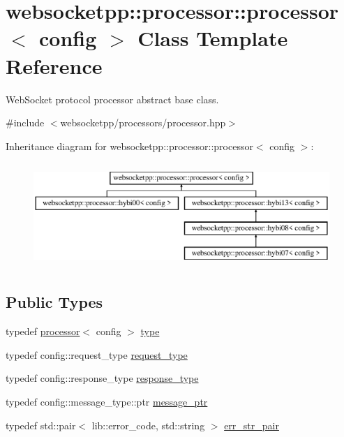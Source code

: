 \hypertarget{classwebsocketpp_1_1processor_1_1processor}{}\section{websocketpp\+:\+:processor\+:\+:processor$<$ config $>$ Class Template Reference}
\label{classwebsocketpp_1_1processor_1_1processor}


Web\+Socket protocol processor abstract base class.  




{\ttfamily \#include $<$websocketpp/processors/processor.\+hpp$>$}

Inheritance diagram for websocketpp\+:\+:processor\+:\+:processor$<$ config $>$\+:\begin{figure}[H]
\begin{center}
\leavevmode
\includegraphics[height=4.000000cm]{classwebsocketpp_1_1processor_1_1processor}
\end{center}
\end{figure}
\subsection*{Public Types}
\begin{DoxyCompactItemize}
\item 
typedef \hyperlink{classwebsocketpp_1_1processor_1_1processor}{processor}$<$ config $>$ \hyperlink{classwebsocketpp_1_1processor_1_1processor_ae897e7144ad7b9ece176d13ea5078ae2}{type}
\item 
typedef config\+::request\+\_\+type \hyperlink{classwebsocketpp_1_1processor_1_1processor_ac3926102ce2422e6b40ccea41e764233}{request\+\_\+type}
\item 
typedef config\+::response\+\_\+type \hyperlink{classwebsocketpp_1_1processor_1_1processor_aa8d088af1bdb838f1e86df6cf4395981}{response\+\_\+type}
\item 
typedef config\+::message\+\_\+type\+::ptr \hyperlink{classwebsocketpp_1_1processor_1_1processor_a7f189eb2eb87b7293d46026fa0950635}{message\+\_\+ptr}
\item 
typedef std\+::pair$<$ lib\+::error\+\_\+code, std\+::string $>$ \hyperlink{classwebsocketpp_1_1processor_1_1processor_aa17cb49b100ed209ca8650895812be11}{err\+\_\+str\+\_\+pair}
\end{DoxyCompactItemize}
